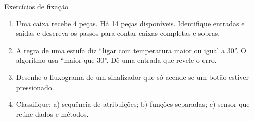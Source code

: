 \begin{frame}[t]{Exercícios de fixação}
\begin{enumerate}
\item Uma caixa recebe 4 peças. Há 14 peças disponíveis. Identifique entradas e saídas e descreva os passos para contar caixas completas e sobras.
\item A regra de uma estufa diz ``ligar com temperatura maior ou igual a 30''. O algoritmo usa ``maior que 30''. Dê uma entrada que revele o erro.
\item Desenhe o fluxograma de um sinalizador que só acende se um botão estiver pressionado.
\item Classifique: a) sequência de atribuições; b) funções separadas; c) sensor que reúne dados e métodos.
\end{enumerate}
\end{frame}

